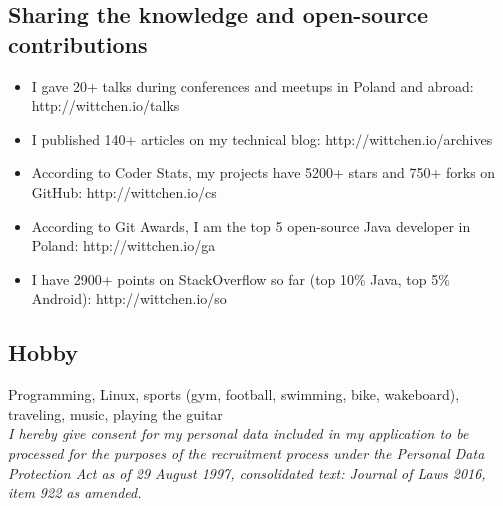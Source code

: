 \documentclass[8pt]{extarticle}
\begin{document}
    \subsection*{\normalsize{Sharing the knowledge and open-source contributions}}
    \begin{itemize}
      \item I gave 20+ talks during conferences and meetups in Poland and abroad: http://wittchen.io/talks
      \item I published 140+ articles on my technical blog: http://wittchen.io/archives
      \item According to Coder Stats, my projects have 5200+ stars and 750+ forks on GitHub: http://wittchen.io/cs
      \item According to Git Awards, I am the top 5 open-source Java developer in Poland: http://wittchen.io/ga
      \item I have 2900+ points on StackOverflow so far (top 10\% Java, top 5\% Android): http://wittchen.io/so
    \end{itemize}

    \subsection*{\normalsize{Hobby}}
    Programming, Linux, sports (gym, football, swimming, bike, wakeboard), traveling, music, playing the guitar\\

    \textit{
    I hereby give consent for my personal data included in my application
    to be processed for the purposes of the recruitment process
    under the Personal Data Protection Act as of 29 August 1997,
    consolidated text: Journal of Laws 2016, item 922 as amended.
    }
\end{document}
